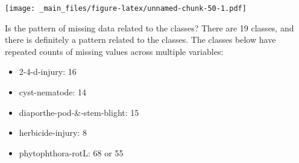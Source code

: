 \documentclass[]{book}
\newenvironment{Shaded}{\begin{snugshade}}{\end{snugshade}}
\newcommand{\CommentTok}[1]{\textcolor[rgb]{0.56,0.35,0.01}{\textit{#1}}}
\newcommand{\DataTypeTok}[1]{\textcolor[rgb]{0.13,0.29,0.53}{#1}}
\newcommand{\DecValTok}[1]{\textcolor[rgb]{0.00,0.00,0.81}{#1}}
\newcommand{\KeywordTok}[1]{\textcolor[rgb]{0.13,0.29,0.53}{\textbf{#1}}}
\newcommand{\NormalTok}[1]{#1}
\newcommand{\OperatorTok}[1]{\textcolor[rgb]{0.81,0.36,0.00}{\textbf{#1}}}
\newcommand{\OtherTok}[1]{\textcolor[rgb]{0.56,0.35,0.01}{#1}}
\newcommand{\StringTok}[1]{\textcolor[rgb]{0.31,0.60,0.02}{#1}}
\providecommand{\tightlist}{%
  \setlength{\itemsep}{0pt}\setlength{\parskip}{0pt}}
\begin{document}
\begin{Shaded}
\end{Shaded}

\texttt{[image: \_main\_files/figure-latex/unnamed-chunk-50-1.pdf]}

Is the pattern of missing data related to the classes? There are 19 classes, and there is definitely a pattern related to the classes. The classes below have repeated counts of missing values across multiple variables:

\begin{itemize}
\tightlist
\item
  2-4-d-injury: 16
\item
  cyst-nematode: 14
\item
  diaporthe-pod-\&-stem-blight: 15
\item
  herbicide-injury: 8
\item
  phytophthora-rotL: 68 or 55
\end{itemize}

\begin{Shaded}
\end{Shaded}
\end{document}
